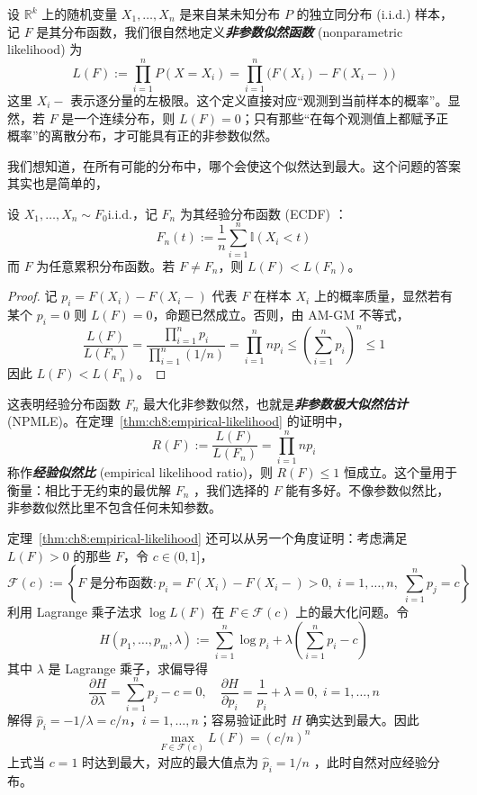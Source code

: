 设 $\mathbb{R}^k$ 上的随机变量 $X_1, \dots, X_n$ 是来自某未知分布 $P$ 的独立同分布 (i.i.d.) 样本，记 $F$ 是其分布函数，我们很自然地定义\textbf{\emph{非参数似然函数 }} (nonparametric likelihood) 为
\[L(F) := \prod_{i=1}^n P(X = X_i) = \prod_{i=1}^n \bigl(F(X_i) - F(X_i -)\bigr)\]
这里 $X_i-$ 表示逐分量的左极限。这个定义直接对应``观测到当前样本的概率''。显然，若 $F$ 是一个连续分布，则 $L(F)=0$；只有那些``在每个观测值上都赋予正概率''的离散分布，才可能具有正的非参数似然。

我们想知道，在所有可能的分布中，哪个会使这个似然达到最大。这个问题的答案其实也是简单的，

\begin{theorem}\label{thm:ch8:empirical-likelihood}

设 $X_1, \dots, X_n \sim F_0$i.i.d.，记 $F_n$ 为其经验分布函数 (ECDF) ：
\[F_n(t):=\frac1n\sum_{i=1}^n\mathbb I(X_i< t)\]
而 $F$ 为任意累积分布函数。若 $F \neq F_n$，则 $L(F) < L(F_n)$。

\end{theorem}

\begin{proof}

记 $p_i = F(X_i) - F(X_i -)$ 代表 $F$ 在样本 $X_i$ 上的概率质量，显然若有某个 $p_i = 0$ 则 $L(F) = 0$，命题已然成立。否则，由 AM-GM 不等式，\[
\frac{L(F)}{L(F_n)} = \frac{\prod_{i=1}^np_i}{\prod_{i=1}^n(1/n)}=\prod_{i=1}^nnp_i\le \left(\sum_{i=1}^np_i\right)^n\le 1\]
因此 $L(F) < L(F_n)$。

\end{proof}

这表明经验分布函数 $F_n$ 最大化非参数似然，也就是\textbf{\emph{非参数极大似然估计}} (NPMLE)。在定理~\ref{thm:ch8:empirical-likelihood} 的证明中，\[
R(F) := \frac{L(F)}{L(F_n)}=\prod_{i=1}^nnp_i\]
称作\textbf{\emph{经验似然比}} (empirical likelihood ratio)，则 $R(F)\le 1$ 恒成立。这个量用于衡量：相比于无约束的最优解 $F_n$ ，我们选择的 $F$ 能有多好。不像参数似然比，非参数似然比里不包含任何未知参数。

定理~\ref{thm:ch8:empirical-likelihood} 还可以从另一个角度证明：考虑满足 $L(F) > 0$ 的那些 $F$，令 $c \in (0, 1]$，\[
\mathcal{F}(c) := \left\{F\text{ 是分布函数} : p_i = F(X_i)-F(X_i-) > 0,\; i=1,\dots,n,\; \sum_{i=1}^n p_j = c \right\}\]
利用 Lagrange 乘子法求 $\log L(F)$ 在 $F \in \mathcal{F}(c)$ 上的最大化问题。令\[
H(p_1, \dots, p_m, \lambda) := \sum_{i=1}^n \log p_i + \lambda \left( \sum_{i=1}^n p_i - c \right)\]
其中 $\lambda$ 是 Lagrange 乘子，求偏导得\[
\frac{\partial H}{\partial \lambda} = \sum_{i=1}^n p_j - c = 0, \quad \frac{\partial H}{\partial p_i} = \frac{1}{p_i} + \lambda = 0,\; i = 1, \dots, n\]
解得 $\widehat p_i =-1/\lambda= c/n$，$i = 1, \dots, n$；容易验证此时 $H$ 确实达到最大。因此
\[\max_{F \in \mathcal{F}(c)} L(F) = (c/n)^n\]
上式当 $c=1$ 时达到最大，对应的最大值点为 $\widehat p_i = 1/n$ ，此时自然对应经验分布。

